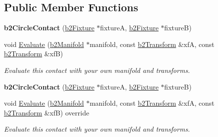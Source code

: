 \subsection*{Public Member Functions}
\begin{DoxyCompactItemize}
\item 
\mbox{\label{classb2CircleContact_a77e06c857edb2ca171340898f09ef789}} 
{\bfseries b2\+Circle\+Contact} (\hyperlink{classb2Fixture}{b2\+Fixture} $\ast$fixtureA, \hyperlink{classb2Fixture}{b2\+Fixture} $\ast$fixtureB)
\item 
\mbox{\label{classb2CircleContact_ac0651dda773561b8561b8efa3cd31d5c}} 
void \hyperlink{classb2CircleContact_ac0651dda773561b8561b8efa3cd31d5c}{Evaluate} (\hyperlink{structb2Manifold}{b2\+Manifold} $\ast$manifold, const \hyperlink{structb2Transform}{b2\+Transform} \&xfA, const \hyperlink{structb2Transform}{b2\+Transform} \&xfB)
\begin{DoxyCompactList}\small\item\em Evaluate this contact with your own manifold and transforms. \end{DoxyCompactList}\item 
\mbox{\label{classb2CircleContact_a77e06c857edb2ca171340898f09ef789}} 
{\bfseries b2\+Circle\+Contact} (\hyperlink{classb2Fixture}{b2\+Fixture} $\ast$fixtureA, \hyperlink{classb2Fixture}{b2\+Fixture} $\ast$fixtureB)
\item 
\mbox{\label{classb2CircleContact_a90036965fd66469e916a5afc6c244092}} 
void \hyperlink{classb2CircleContact_a90036965fd66469e916a5afc6c244092}{Evaluate} (\hyperlink{structb2Manifold}{b2\+Manifold} $\ast$manifold, const \hyperlink{structb2Transform}{b2\+Transform} \&xfA, const \hyperlink{structb2Transform}{b2\+Transform} \&xfB) override
\begin{DoxyCompactList}\small\item\em Evaluate this contact with your own manifold and transforms. \end{DoxyCompactList}\end{DoxyCompactItemize}
